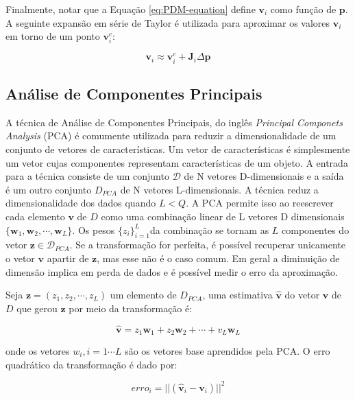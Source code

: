 {Finalmente, notar que a Equação \ref{eq:PDM-equation} define $\mathbf{v}_i$ como função de $\mathbf{p}$. A seguinte expansão em série de Taylor é utilizada para aproximar os valores $\mathbf{v}_i$ em torno de um ponto $\mathbf{v}_i^c$:

\begin{equation}
\mathbf{v}_i \approx \mathbf{v}_i^c + \mathbf{J}_i \Delta \mathbf{p}
\label{eq:alg2}
\end{equation}


\subsection{Análise de Componentes Principais}

A técnica de Análise de Componentes Principais, do inglês  \textit{Principal Componets Analysis} (PCA) é comumente utilizada para reduzir a
dimensionalidade de um conjunto de vetores de características. Um vetor de características é simplesmente um vetor cujas componentes representam características de um objeto.  A entrada para a
técnica consiste de um conjunto $\mathcal{D}$ de N vetores D-dimensionais e a saída é um
outro conjunto $D_{PCA}$ de N vetores L-dimensionais. A técnica reduz a
dimensionalidade dos dados quando $L < Q$. A PCA permite isso ao reescrever cada
elemento $\bm{v}$ de $D$ como uma combinação linear de L vetores D dimensionais
$\{ \mathbf{w}_1, \mathbf{w}_2, \cdots, \mathbf{w}_L\}$.
Os pesos $\{z_i\}_{i=1}^L$da combinação se tornam as $L$ componentes do vetor $\mathbf{z} \in \mathcal{D}_{PCA}$. Se a
transformação for perfeita, é possível recuperar unicamente o vetor $\mathbf{v}$ apartir de $\mathbf{z}$, mas esse não é o caso comum. Em geral a diminuição de
dimensão implica em perda de dados e é possível medir o erro da aproximação. 

Seja $\mathbf{z} = (z_1, z_2, \cdots, z_L)$ um elemento de $D_{PCA}$, uma
estimativa $\mathbf{\hat{v}}$ do vetor $\mathbf{v}$ de $D$ que gerou $\mathbf{z}$ por meio da transformação é:

\begin{equation}
\mathbf{\hat{v}} = z_1 \mathbf{w}_1 + z_2 \mathbf{w}_2 + \cdots + v_L \mathbf{w}_L
\end{equation}

onde os vetores $w_i, i = 1 \cdots L$ são os vetores base aprendidos pela
PCA. O erro quadrático da transformação é dado por:

\begin{equation}
erro_i = ||(\mathbf{\hat{v}}_{i} - \mathbf{v}_i)||^2
\end{equation}

}
